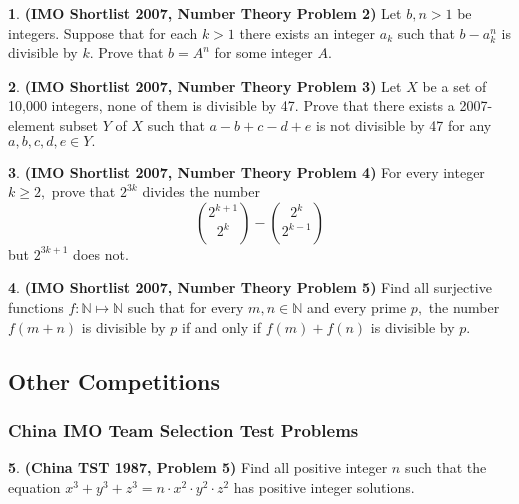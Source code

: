 \documentclass{article}
\newcommand{\plus}{+}
\newcommand{\minus}{-}
\newcommand{\equal}{=}
\theoremstyle{definition}
\newtheorem{p}{}
\begin{document}
\begin{p}{\bf (IMO Shortlist 2007, Number Theory Problem 2)}
Let $ b,n > 1$ be integers. Suppose that for each $ k > 1$ there exists an integer $ a_k$ such that $ b \minus{} a^n_k$ is divisible by $ k.$ Prove that $ b \equal{} A^n$ for some integer $ A.$
\end{p}



\begin{p}{\bf (IMO Shortlist 2007, Number Theory Problem 3)}
Let $ X$ be a set of 10,000 integers, none of them is divisible by 47. Prove that there exists a 2007-element subset $ Y$ of $ X$ such that $ a \minus{} b \plus{} c \minus{} d \plus{} e$ is not divisible by 47 for any $ a,b,c,d,e \in Y.$
\end{p}



\begin{p}{\bf (IMO Shortlist 2007, Number Theory Problem 4)}
For every integer $ k \geq 2,$ prove that $ 2^{3k}$ divides the number
\[ \binom{2^{k \plus{} 1}}{2^{k}} \minus{} \binom{2^{k}}{2^{k \minus{} 1}}\]
but $ 2^{3k \plus{} 1}$ does not.
\end{p}



\begin{p}{\bf (IMO Shortlist 2007, Number Theory Problem 5)}
Find all surjective functions $ f: \mathbb{N} \mapsto \mathbb{N}$ such that for every $ m,n \in \mathbb{N}$ and every prime $ p,$ the number $ f(m \plus{} n)$ is divisible by $ p$ if and only if $ f(m) \plus{} f(n)$ is divisible by $ p.$
\end{p}


\subsection{Other Competitions}

\subsubsection{China IMO Team Selection Test Problems}



\begin{p}{\bf (China TST 1987, Problem 5)}
Find all positive integer $n$ such that the equation $x^3+y^3+z^3=n \cdot x^2 \cdot y^2 \cdot z^2$ has positive integer solutions.
\end{p}
\end{document}
